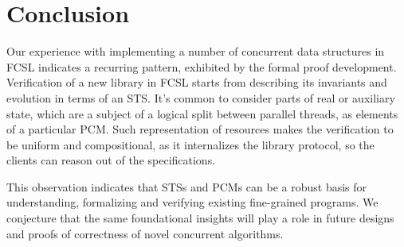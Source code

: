 
\section{Conclusion}
\label{sec:conclusion}


Our experience with implementing a number of concurrent data
structures in FCSL indicates a recurring pattern, exhibited by the
formal proof development.
%
Verification of a new library in FCSL starts from describing its
invariants and evolution in terms of an STS. It's common to consider
parts of real or auxiliary state, which are a subject of a logical
split between parallel threads, as elements of a particular PCM.
%
Such representation of resources makes the verification to be uniform
and compositional, as it internalizes the library protocol, so the
clients can reason out of the specifications.

This observation indicates that STSs and PCMs can be a robust basis
for understanding, formalizing and verifying existing fine-grained
programs. We conjecture that the same foundational insights will play
a role in future designs and proofs of correctness of novel concurrent
algorithms.

%

